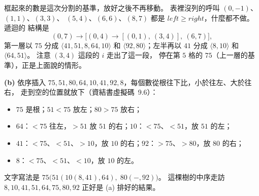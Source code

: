 \begin{pastsoln}
框起來的數是這次分割的基準，放好之後不再移動。 表裡沒列的呼叫 $(0, -1)$、$(1, 1)$、$(3, 3)$、
$(5, 4)$、$(6, 6)$、$(8, 7)$ 都是 $\mathit{left} \ge \mathit{right}$，什麼都不做。 遞迴的
結構是
\[
(0,7) \to \bigl[(0,4) \to [(0,1),\ (3,4)],\ (6,7)\bigr],
\]
第一層以 $75$ 分成 $\langle 41, 51, 8, 64, 10\rangle$ 和 $\langle 92, 80\rangle$；左半再以 $41$
分成 $\langle 8, 10\rangle$ 和 $\langle 64, 51\rangle$。 注意 $(3, 4)$ 這段的 $i$ 走出了這一段，
停在第 $5$ 格的 $75$（上一層的基準），正是上面說的情形。

\textbf{(b)} 依序插入 $75, 51, 80, 64, 10, 41, 92, 8$，每個數從根往下比，小於往左、大於往右，
走到空的位置就放下（資結書虛擬碼~9.6）：
\begin{itemize}
\item $75$ 是根；$51 < 75$ 放左；$80 > 75$ 放右；
\item $64$：$< 75$ 往左，$> 51$ 放 $51$ 的右；$10$：$< 75$、$< 51$，放 $51$ 的左；
\item $41$：$< 75$、$< 51$、$> 10$，放 $10$ 的右；$92$：$> 75$、$> 80$，放 $80$ 的右；
\item $8$：$< 75$、$< 51$、$< 10$，放 $10$ 的左。
\end{itemize}
\begin{center}
\end{center}
文字寫法是 $75\bigl(51(10(8, 41), 64),\; 80(-, 92)\bigr)$。 這棵樹的中序走訪
$8, 10, 41, 51, 64, 75, 80, 92$ 正好是 (a) 排好的結果。
\end{pastsoln}
